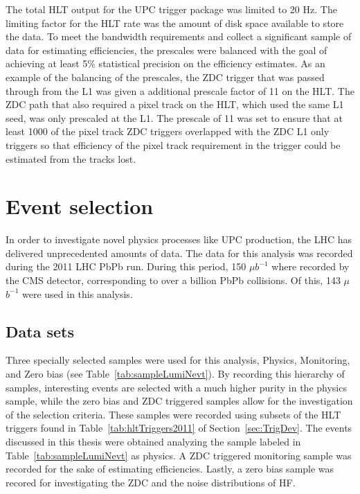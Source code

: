       The total HLT output for the UPC trigger package was limited to 20 Hz. 
      The limiting factor for the HLT rate was the amount of disk space 
        available to store the data. 
      To meet the bandwidth requirements and collect a significant sample
        of data for estimating efficiencies, the prescales were balanced with 
        the goal of achieving at least 5\% statistical precision on the 
        efficiency estimates. 
      As an example of the balancing of the prescales, the  ZDC trigger that 
        was passed through from the L1 was given a additional prescale factor 
        of 11 on the HLT.
      The ZDC path that also required a pixel track on the HLT, which used 
        the same L1 seed, was only prescaled at the L1.
      The prescale of 11 was set to ensure that at least 1000 of the pixel track 
        ZDC triggers overlapped with the ZDC L1 only triggers so that efficiency
        of the pixel track requirement in the trigger could be estimated from 
        the tracks lost. 

  \section{\label{sec:DataSetEvSel} Event selection}
    In order to investigate novel physics processes like UPC \JPsi{} 
     production, the LHC has delivered unprecedented amounts of data.
    The data for this analysis was recorded during the 2011 LHC PbPb run. 
    During this period, 150 $\mu$$b^{-1}$ where recorded by the CMS detector,
      corresponding to over a billion PbPb collisions. 
    Of this, 143 $\mu$$b^{-1}$ were used in this analysis.
  
    \subsection{Data sets}
      Three specially selected samples were used for this analysis, 
        Physics, Monitoring, and Zero bias (see Table~\ref{tab:sampleLumiNevt}).
      By recording this hierarchy of samples, interesting events are selected 
        with a much higher purity in the physics sample, while the zero bias and 
        ZDC triggered samples allow for the investigation of the selection 
        criteria. 
      These samples were recorded using subsets of the HLT triggers found in 
        Table~\ref{tab:hltTriggers2011} of Section~\ref{sec:TrigDev}.
      The \JPsi{} events discussed in this thesis were obtained analyzing the 
        sample labeled in Table~\ref{tab:sampleLumiNevt} as physics.
      A ZDC triggered monitoring sample was recorded for the sake of estimating
        efficiencies.
      Lastly, a zero bias sample was recored for investigating the ZDC and the 
        noise distributions of HF.
  
